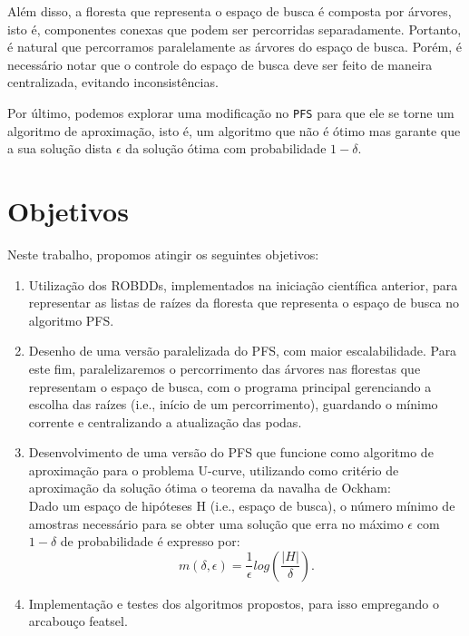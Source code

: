 \documentclass[12pt]{article}
\begin{document}
Além disso, a floresta que representa o espaço de busca é composta por
árvores, isto é, componentes conexas que podem ser percorridas 
separadamente. Portanto, é natural que percorramos paralelamente as 
árvores do espaço de busca. Porém, é necessário notar que o controle do
espaço de busca deve ser feito de maneira centralizada, evitando 
inconsistências.

Por último, podemos explorar uma modificação no {\tt PFS} para que ele
se torne um algoritmo de aproximação, isto é, um algoritmo que não é 
ótimo mas garante que a sua solução dista $\epsilon$ da solução ótima
com probabilidade $1 - \delta$.

\section{Objetivos}
Neste trabalho, propomos atingir os seguintes objetivos:

\begin{enumerate}
\item Utilização dos ROBDDs, implementados na iniciação científica
anterior, para representar as listas de raízes da floresta que 
representa o espaço de busca no algoritmo PFS.

\item Desenho de uma versão paralelizada do PFS, com maior
escalabilidade. Para este fim, paralelizaremos o percorrimento das
árvores nas florestas que representam o espaço de busca, com o programa
principal gerenciando a escolha das raízes (i.e., início de um 
percorrimento), guardando o mínimo corrente e centralizando a
atualização das podas.

\item Desenvolvimento de uma versão do PFS que funcione como algoritmo 
de aproximação para o problema U-curve, utilizando como critério de
aproximação da solução ótima o teorema da navalha de Ockham:\\
\smallskip
Dado um espaço de hipóteses H (i.e., espaço de busca), o número mínimo 
de amostras necessário para se obter uma solução que erra no máximo 
$\epsilon$ com $1 - \delta$ de probabilidade é expresso por:
\begin{equation}
\displaystyle  m(\delta,\epsilon) = 
    \frac{1}{\epsilon} log (\frac{|H|}{\delta}).
\end{equation}

\item Implementação e testes dos algoritmos propostos, para isso
empregando o arcabouço featsel.
\end{enumerate}
\end{document}
